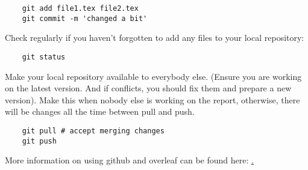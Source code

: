 \begin{verbatim}
    git add file1.tex file2.tex
    git commit -m 'changed a bit'
\end{verbatim}

Check regularly if you haven't forgotten to add any files to your local repository:
\begin{verbatim}
    git status
\end{verbatim}

Make your local repository available to everybody else. (Ensure you are working on the latest version. And if conflicts, you should fix them and prepare a new version). Make this when nobody else is working on the report, otherwise, there will be changes all the time between pull and push.
\begin{verbatim}
    git pull # accept merging changes
    git push
\end{verbatim}

More information on using github and overleaf can be found here: \href{https://confluence.desy.de/download/attachments/97009435/overleaf_git_howto.pdf?version=1&modificationDate=1550237113964&api=v2}.
